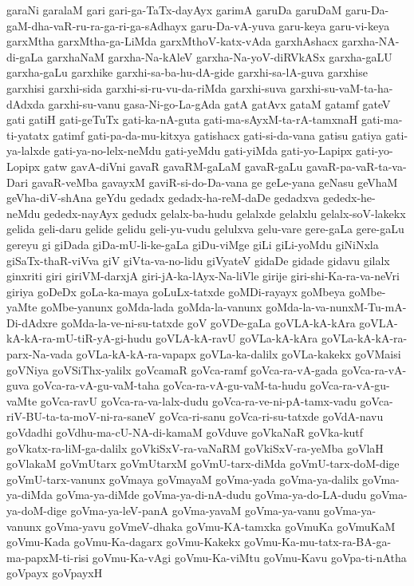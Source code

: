 {garaNi
garalaM
gari
gari-ga-TaTx-dayAyx
garimA
garuDa
garuDaM
garu-Da-gaM-dha-vaR-ru-ra-ga-ri-ga-sAdhayx
garu-Da-vA-yuva
garu-keya
garu-vi-keya
garxMtha
garxMtha-ga-LiMda
garxMthoV-katx-vAda
garxhAshacx
garxha-NA-di-gaLa
garxhaNaM
garxha-Na-kAleV
garxha-Na-yoV-diRVkASx
garxha-gaLU
garxha-gaLu
garxhike
garxhi-sa-ba-hu-dA-gide
garxhi-sa-lA-guva
garxhise
garxhisi
garxhi-sida
garxhi-si-ru-vu-da-riMda
garxhi-suva
garxhi-su-vaM-ta-ha-dAdxda
garxhi-su-vanu
gasa-Ni-go-La-gAda
gatA
gatAvx
gataM
gatamf
gateV
gati
gatiH
gati-geTuTx
gati-ka-nA-guta
gati-ma-sAyxM-ta-rA-tamxnaH
gati-ma-ti-yatatx
gatimf
gati-pa-da-mu-kitxya
gatishacx
gati-si-da-vana
gatisu
gatiya
gati-ya-lalxde
gati-ya-no-lelx-neMdu
gati-yeMdu
gati-yiMda
gati-yo-Lapipx
gati-yo-Lopipx
gatw
gavA-diVni
gavaR
gavaRM-gaLaM
gavaR-gaLu
gavaR-pa-vaR-ta-va-Dari
gavaR-veMba
gavayxM
gaviR-si-do-Da-vana
ge
geLe-yana
geNasu
geVhaM
geVha-diV-shAna
geYdu
gedadx
gedadx-ha-reM-daDe
gedadxva
gededx-he-neMdu
gededx-nayAyx
gedudx
gelalx-ba-hudu
gelalxde
gelalxlu
gelalx-soV-lakekx
gelida
geli-daru
gelide
gelidu
geli-yu-vudu
gelulxva
gelu-vare
gere-gaLa
gere-gaLu
gereyu
gi
giDada
giDa-mU-li-ke-gaLa
giDu-viMge
giLi
giLi-yoMdu
giNiNxla
giSaTx-thaR-viVva
giV
giVta-va-no-lidu
giVyateV
gidaDe
gidade
gidavu
gilalx
ginxriti
giri
giriVM-darxjA
giri-jA-ka-lAyx-Na-liVle
girije
giri-shi-Ka-ra-va-neVri
giriya
goDeDx
goLa-ka-maya
goLuLx-tatxde
goMDi-rayayx
goMbeya
goMbe-yaMte
goMbe-yanunx
goMda-lada
goMda-la-vanunx
goMda-la-va-nunxM-Tu-mA-Di-dAdxre
goMda-la-ve-ni-su-tatxde
goV
goVDe-gaLa
goVLA-kA-kAra
goVLA-kA-kA-ra-mU-tiR-yA-gi-hudu
goVLA-kA-ravU
goVLa-kA-kAra
goVLa-kA-kA-ra-parx-Na-vada
goVLa-kA-kA-ra-vapapx
goVLa-ka-dalilx
goVLa-kakekx
goVMaisi
goVNiya
goVSiThx-yalilx
goVcamaR
goVca-ramf
goVca-ra-vA-gada
goVca-ra-vA-guva
goVca-ra-vA-gu-vaM-taha
goVca-ra-vA-gu-vaM-ta-hudu
goVca-ra-vA-gu-vaMte
goVca-ravU
goVca-ra-va-lalx-dudu
goVca-ra-ve-ni-pA-tamx-vadu
goVca-riV-BU-ta-ta-moV-ni-ra-saneV
goVca-ri-sanu
goVca-ri-su-tatxde
goVdA-navu
goVdadhi
goVdhu-ma-cU-NA-di-kamaM
goVduve
goVkaNaR
goVka-kutf
goVkatx-ra-liM-ga-dalilx
goVkiSxV-ra-vaNaRM
goVkiSxV-ra-yeMba
goVlaH
goVlakaM
goVmUtarx
goVmUtarxM
goVmU-tarx-diMda
goVmU-tarx-doM-dige
goVmU-tarx-vanunx
goVmaya
goVmayaM
goVma-yada
goVma-ya-dalilx
goVma-ya-diMda
goVma-ya-diMde
goVma-ya-di-nA-dudu
goVma-ya-do-LA-dudu
goVma-ya-doM-dige
goVma-ya-leV-panA
goVma-yavaM
goVma-ya-vanu
goVma-ya-vanunx
goVma-yavu
goVmeV-dhaka
goVmu-KA-tamxka
goVmuKa
goVmuKaM
goVmu-Kada
goVmu-Ka-dagarx
goVmu-Kakekx
goVmu-Ka-mu-tatx-ra-BA-ga-ma-papxM-ti-risi
goVmu-Ka-vAgi
goVmu-Ka-viMtu
goVmu-Kavu
goVpa-ti-nAtha
goVpayx
goVpayxH
}
